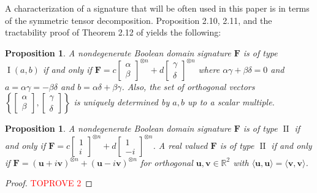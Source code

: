 \documentclass[11pt]{article}
\newtheorem{proposition}[theorem]{Proposition}
\DeclareMathOperator{\typei}{I}
\DeclareMathOperator{\typeii}{II}
\begin{document}
A characterization of a signature that will be often used in this paper is in terms of the symmetric tensor decomposition.
Proposition 2.10, 2.11, and the tractability proof of Theorem 2.12 of \cite{cai_complexity_2017} yields the following:
\begin{proposition}\label{prop:boolean-type-i-tensor-decomposition}
  A nondegenerate Boolean domain signature $\mathbf{F}$ is of type $\typei(a, b)$ if and only if $\mathbf{F} = c \begin{bmatrix}
  \alpha \\ \beta
  \end{bmatrix}^{\otimes n} + d \begin{bmatrix}
  \gamma \\ \delta
  \end{bmatrix}^{\otimes n}$ where $\alpha \gamma + \beta \delta = 0$ and $a = \alpha \gamma = - \beta \delta$ and $b = \alpha \delta + \beta \gamma$.
  Also, the set of orthogonal vectors $\left\{ \begin{bmatrix}
  \alpha \\ \beta
  \end{bmatrix}, \begin{bmatrix}
  \gamma \\ \delta
  \end{bmatrix} \right\}$ is uniquely determined by $a, b$ up to a scalar multiple.
\end{proposition}
\begin{proposition}\label{prop-boolean-type-ii-tensor-decomposition}
  A nondegenerate Boolean domain signature $\mathbf{F}$ is of type $\typeii$ if and only if 
  $\mathbf{F} = c \begin{bmatrix}
  1 \\ i
  \end{bmatrix}^{\otimes n} + d \begin{bmatrix}
  1 \\ -i
  \end{bmatrix}^{\otimes n}$.
  A real valued $\mathbf{F}$ is of type $\typeii$ if and only if $\mathbf{F} = (\mathbf{u} + i \mathbf{v})^{\otimes n} + (\mathbf{u} - i \mathbf{v})^{\otimes n}$ for orthogonal $\mathbf{u}, \mathbf{v} \in \mathbb{R}^2$ with $\langle \mathbf{u}, \mathbf{u} \rangle = \langle \mathbf{v}, \mathbf{v} \rangle$.
\end{proposition}
\begin{proof}\textcolor{red}{TOPROVE 2}\end{proof}
\end{document}
